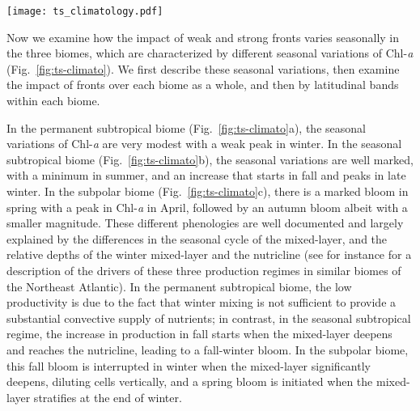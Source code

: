 \begin{figure*}
  \texttt{[image: ts\_climatology.pdf]}
  \caption{
    Seasonal impact of fronts on Chl\nobreakdash-\emph{a} in the permanent subtropical biome (1st column), in the seasonal subtropical biome (2nd column) and in the subpolar biome (3rd column).
    (a-b-c) Chl\nobreakdash-\emph{a} median values (top row) over weak fronts (blue), strong fronts (green) and background (red).
    The differences between the curves show the local impact at the scale of fronts.
    (d-e-f) Surface fraction occupied by weak fronts and strong fronts.
    (g-h-i) Global Chl\nobreakdash-\emph{a} surplus due to weak fronts and strong fronts at the scale of the biome.
    The surplus accounts for the local excess and for the number of fronts (see method).
    The plain lines represent the climatological mean, and the envelopes mark the standard deviation over the period 2000--2020.
    Chl\nobreakdash-\emph{a} is more strongly enhanced over strong fronts than over weak fronts, but weak fronts are more numerous than strong fronts, resulting in a Chl\nobreakdash-\emph{a} surplus that can be reversed.
  }%
  \label{fig:ts-climato}
\end{figure*}

Now we examine how the impact of weak and strong fronts varies seasonally in the three biomes, which are characterized by different seasonal variations of Chl\nobreakdash-\emph{a} (Fig.~\ref{fig:ts-climato}).
We first describe these seasonal variations, then examine the impact of fronts over each biome as a whole, and then by latitudinal bands within each biome.

In the permanent subtropical biome (Fig.~\ref{fig:ts-climato}a), the seasonal variations of Chl\nobreakdash-\emph{a} are very modest with a weak peak in winter.
In the seasonal subtropical biome (Fig.~\ref{fig:ts-climato}b), the seasonal variations are well marked, with a minimum in summer, and an increase that starts in fall and peaks in late winter.
In the subpolar biome (Fig.~\ref{fig:ts-climato}c), there is a marked bloom in spring with a peak in Chl\nobreakdash-\emph{a} in April, followed by an autumn bloom albeit with a smaller magnitude.
These different phenologies are well documented and largely explained by the differences in the seasonal cycle of the mixed-layer, and the relative depths of the winter mixed-layer and the nutricline (see for instance \citet{levy_2005a} for a description of the drivers of these three production regimes in similar biomes of the Northeast Atlantic).
In the permanent subtropical biome, the low productivity is due to the fact that winter mixing is not sufficient to provide a substantial convective supply of nutrients; in contrast, in the seasonal subtropical regime, the increase in production in fall starts when the mixed-layer deepens and reaches the nutricline, leading to a fall-winter bloom.
In the subpolar biome, this fall bloom is interrupted in winter when the mixed-layer significantly deepens, diluting cells vertically, and a spring bloom is initiated when the mixed-layer stratifies at the end of winter.

